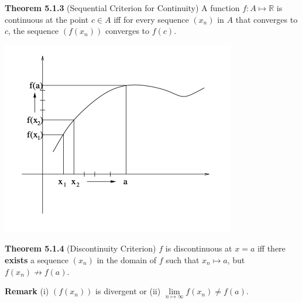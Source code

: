 \documentclass[10pt,landscape]{article}
\begin{document}
\begin{multicols}{4}





\textbf{Theorem 5.1.3} (Sequential Criterion for Continuity) A function $f : A \mapsto \mathbb{R}$ is continuous at the point $c \in A$ iff for every sequence $(x_n)$ in $A$ that converges to $c$, the sequence $(f(x_n))$ converges to $f(c)$.

\includegraphics[width=\columnwidth]{images/sequential-criterion-continuity.png}

\textbf{Theorem 5.1.4} (Discontinuity Criterion) $f$ is discontinuous at $x = a$ iff there \textbf{exists} a sequence $(x_n)$ in the domain of $f$ such that $x_n \mapsto a$, but $f(x_n) \nrightarrow f(a)$. 

\textbf{Remark} (i) $(f(x_n))$ is divergent or (ii) $\underset{n \mapsto \infty}{\lim} f(x_n) \neq f(a)$.


\end{multicols}
\end{document}
